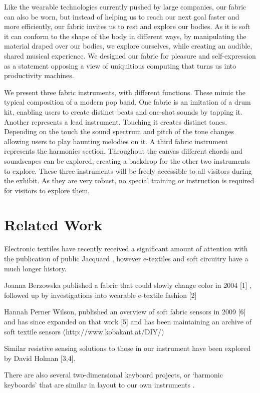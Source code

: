 \documentclass{sigchi-ext}
\begin{document}
Like the wearable technologies currently pushed by large companies, our fabric can also be worn, but instead of helping us to reach our next goal faster and more efficiently, our fabric invites us to rest and explore our bodies. As it is soft it can conform to the shape of the body in different ways, by manipulating the material draped over our bodies, we explore ourselves, while creating an audible, shared musical experience. We designed our fabric for pleasure and self-expression as a statement opposing a view of uniquitious computing that turns us into productivity machines.

We present three fabric instruments, with different functions. These mimic the typical composition of a modern pop band. One fabric is an imitation of a drum kit, enabling users to create distinct beats and one-shot sounds by tapping it. Another represents a lead instrument. Touching it creates distinct tones. Depending on the touch the sound spectrum and pitch of the tone changes allowing users to play haunting melodies on it. A third fabric instrument represents the harmonics section. Throughout the canvas different chords and soundscapes can be explored, creating a backdrop for the other two instruments to explore. These three instruments will be freely accessible to all visitors during the exhibit. As they are very robust, no special training or instruction is required for visitors to explore them.



\section{Related Work}
Electronic textiles have recently received a significant amount of attention with the publication of public Jacquard \cite{jacquard}, however e-textiles and soft circuitry have a much longer history. 

Joanna Berzowska published a fabric that could slowly change color in 2004 [1] , followed up by investigations into wearable e-textile fashion [2]

Hannah Perner Wilson, published an overview of soft fabric sensors in 2009 [6] and has since expanded on that work [5] and has been maintaining an archive of soft textile sensors (http://www.kobakant.at/DIY/)

Similar resistive sensing solutions to those in our instrument have been explored by David Holman  [3,4].

There are also several two-dimensional keyboard projects, or ‘harmonic keyboards’ that are similar in layout to our own instruments \cite{lambdoma, seaboard, linnstrument, omnichord}. 
\end{document}

